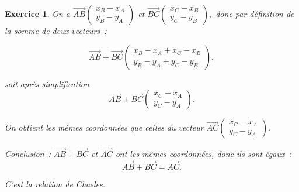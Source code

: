 \documentclass[10pt]{article}
\newtheorem{exo}{Exercice}
\begin{document}
\begin{exo}


On a $\overrightarrow{AB}\begin{pmatrix} x_B-x_A\\y_B-y_A \end{pmatrix}$ et $\overrightarrow{BC}\begin{pmatrix} x_C-x_B\\y_C-y_B \end{pmatrix},$ donc par définition de la somme de deux vecteurs~:

\[\overrightarrow{AB}+\overrightarrow{BC}\begin{pmatrix} x_B-x_A+x_C-x_B\\y_B-y_A+y_C-y_B \end{pmatrix},\]

soit après simplification
\[\overrightarrow{AB}+\overrightarrow{BC}\begin{pmatrix} x_C-x_A\\y_C-y_A \end{pmatrix}.\]

On obtient les mêmes coordonnées que celles du vecteur $\overrightarrow{AC}\begin{pmatrix} x_C-x_A\\y_C-y_A \end{pmatrix}.$

Conclusion~: $\overrightarrow{AB}+\overrightarrow{BC}$ et $\overrightarrow{AC}$ ont les mêmes coordonnées, donc ils sont égaux~:
\[\overrightarrow{AB}+\overrightarrow{BC}=\overrightarrow{AC}.\]

C'est la relation de Chasles.



\end{exo}
\end{document}
